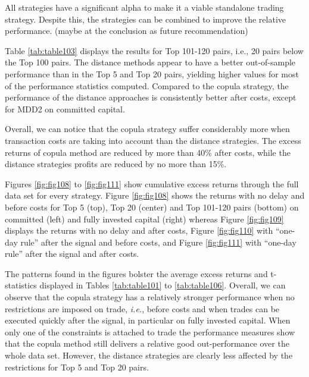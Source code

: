 \documentclass[a4paper]{article}
\begin{document}

	
	
All strategies have a significant alpha to make it a viable standalone trading strategy. Despite this, the strategies can be combined to improve the relative performance. (maybe at the conclusion as future recommendation)

	
	\vspace{1.0cm}
	
	Table \ref{tab:table103} displays the results for Top 101-120 pairs, i.e., 20 pairs below the Top 100 pairs. The distance methods appear to have a better out-of-sample performance than in the Top 5 and Top 20 pairs, yielding higher values for most of the performance statistics computed. Compared to the copula strategy, the performance of the distance approaches is consistently better after costs, except for MDD2 on committed capital.
	
	
	\vspace{0.3cm}
	
	Overall, we can notice that the copula strategy suffer considerably more when transaction costs are taking into account than the distance strategies. The excess returns of copula method are reduced by more than 40\% after costs, while the distance strategies profits are reduced by no more than 15\%.
	

	Figures \ref{fig:fig108} to \ref{fig:fig111} show cumulative excess returns through the full data set for every strategy. Figure \ref{fig:fig108} shows the returns with no delay and before costs for Top 5 (top), Top 20 (center) and Top 101-120 pairs (bottom) on committed (left) and fully invested capital (right) whereas Figure \ref{fig:fig109} displays the returns with no delay and after costs, Figure \ref{fig:fig110} with ``one-day rule'' after the signal and before costs, and Figure \ref{fig:fig111} with ``one-day rule'' after the signal and after costs.
	
	The patterns found in the figures bolster the average excess returns and t-statistics displayed in Tables \ref{tab:table101} to \ref{tab:table106}. Overall, we can observe that the copula strategy has a relatively stronger performance when no restrictions are imposed on trade, \emph{i.e.}, before costs and when trades can be executed quickly after the signal, in particular on fully invested capital. When only one of the constraints is attached to trade the performance measures show that the copula method still delivers a relative good out-performance over the whole data set. However, the distance strategies are clearly less affected by the restrictions for Top 5 and Top 20 pairs.
	
\end{document}
